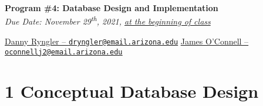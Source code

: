 \documentclass[12pt]{article}
\newcommand{\ts}{\textsuperscript}
\newcommand{\ul}{\underline}
\def\code#1{\texttt{#1}}  %
\providecommand*\emaillink[1]{\nolinkurl{#1}}
\providecommand*\email[1]{\href{mailto:#1}{\emaillink{#1}}}
\begin{document}
\begin{center}
{\Large \textbf{Program \#4: Database Design and Implementation}}\\
\textit{Due Date: November 29\ts{th}, 2021, \underline{at the beginning of class}}

\ul{Danny Ryngler -- \code{\email{dryngler@email.arizona.edu}}}
\ul{James O'Connell -- \code{\email{oconnellj2@email.arizona.edu}}}
\end{center}

\section*{1  Conceptual Database Design}
\end{document}

